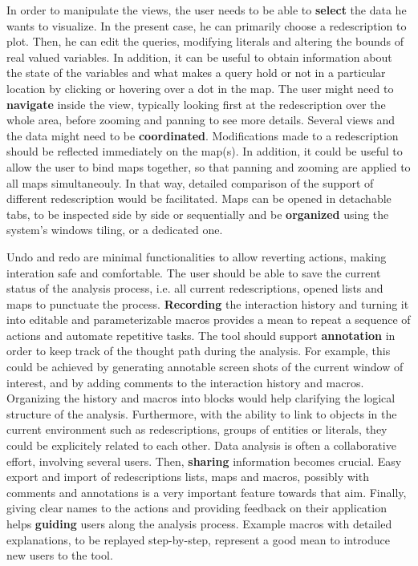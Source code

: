 In order to manipulate the views, the user needs to be able to
\textbf{select} the data he wants to visualize. In the present case,
he can primarily choose a redescription to plot. Then, he can edit the
queries, modifying literals and altering the bounds of real valued
variables. In addition, it can be useful to obtain information about
the state of the variables and what makes a query hold or not in a
particular location by clicking or hovering over a dot in the map.
The user might need to \textbf{navigate} inside the view, typically
looking first at the redescription over the whole area, before zooming
and panning to see more details. Several views and the data might need
to be \textbf{coordinated}.  Modifications made to a redescription
should be reflected immediately on the map(s). In addition, it could
be useful to allow the user to bind maps together, so that panning and
zooming are applied to all maps simultaneouly. In that way, detailed
comparison of the support of different redescription would be
facilitated.  Maps can be opened in detachable tabs, to be inspected
side by side or sequentially and be \textbf{organized} using the
system's windows tiling, or a dedicated one.

Undo and redo are minimal functionalities to allow reverting actions,
making interation safe and comfortable.  The user should be able to
save the current status of the analysis process, i.e. all current
redescriptions, opened lists and maps to punctuate the
process. \textbf{Recording} the interaction history and turning it
into editable and parameterizable macros provides a mean to repeat a
sequence of actions and automate repetitive tasks.  The tool should
support \textbf{annotation} in order to keep track of the thought path
during the analysis.  For example, this could be achieved by
generating annotable screen shots of the current window of interest,
and by adding comments to the interaction history and macros.
Organizing the history and macros into blocks would help clarifying
the logical structure of the analysis.  Furthermore, with the ability
to link to objects in the current environment such as redescriptions,
groups of entities or literals, they could be explicitely related to
each other.  Data analysis is often a collaborative effort, involving
several users. Then, \textbf{sharing} information becomes crucial.
Easy export and import of redescriptions lists, maps and macros,
possibly with comments and annotations is a very important feature
towards that aim.  Finally, giving clear names to the actions and
providing feedback on their application helps \textbf{guiding} users
along the analysis process. Example macros with detailed explanations,
to be replayed step-by-step, represent a good mean to introduce new
users to the tool.


